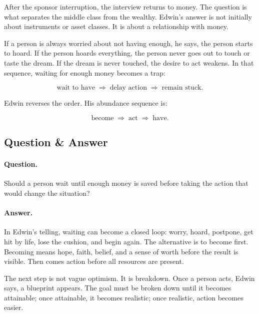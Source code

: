 After the sponsor interruption, the interview returns to money. The question is what separates the middle class from the wealthy. Edwin's answer is not initially about instruments or asset classes. It is about a relationship with money.

If a person is always worried about not having enough, he says, the person starts to hoard. If the person hoards everything, the person never goes out to touch or taste the dream. If the dream is never touched, the desire to act weakens. In that sequence, waiting for enough money becomes a trap:

\begin{equation}
\text{wait to have}
\;\Longrightarrow\;
\text{delay action}
\;\Longrightarrow\;
\text{remain stuck}.
\end{equation}

Edwin reverses the order. His abundance sequence is:

\begin{equation}
\text{become}
\;\Longrightarrow\;
\text{act}
\;\Longrightarrow\;
\text{have}.
\end{equation}

\subsection{Question \& Answer}

\paragraph{Question.}
Should a person wait until enough money is saved before taking the action that would change the situation?

\paragraph{Answer.}
In Edwin's telling, waiting can become a closed loop: worry, hoard, postpone, get hit by life, lose the cushion, and begin again. The alternative is to become first. Becoming means hope, faith, belief, and a sense of worth before the result is visible. Then comes action before all resources are present.

The next step is not vague optimism. It is breakdown. Once a person acts, Edwin says, a blueprint appears. The goal must be broken down until it becomes attainable; once attainable, it becomes realistic; once realistic, action becomes easier.

